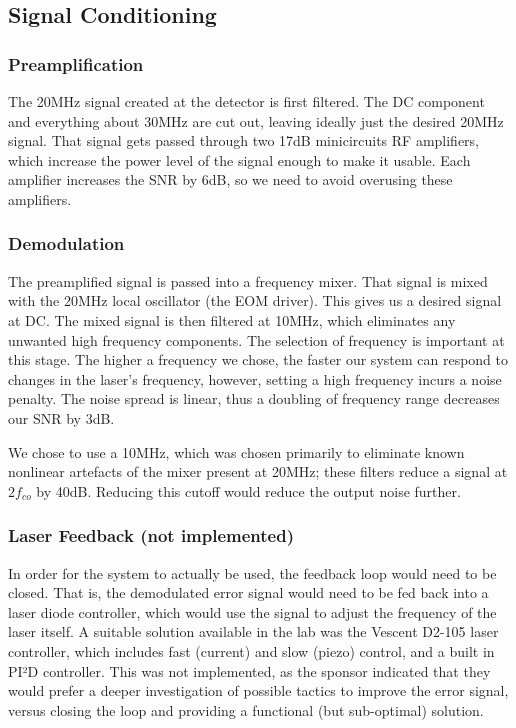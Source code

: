\subsection{Signal Conditioning}
    \subsubsection{Preamplification}

The 20MHz signal created at the detector is first filtered.  The DC component and everything about 30MHz are cut out, leaving ideally just the desired 20MHz signal.  That signal gets passed through two 17dB minicircuits RF amplifiers, which increase the power level of the signal enough to make it usable.  Each amplifier increases the SNR by 6dB, so we need to avoid overusing these amplifiers.

    \subsubsection{Demodulation}

The preamplified signal is passed into a frequency mixer.  That signal is mixed with the 20MHz local oscillator (the EOM driver).  This gives us a desired signal at DC.  The mixed signal is then filtered at 10MHz, which eliminates any unwanted high frequency components.  The selection of frequency is important at this stage.  The higher a frequency we chose, the faster our system can respond to changes in the laser's frequency, however, setting a high frequency incurs a noise penalty.  The noise spread is linear, thus a doubling of frequency range decreases our SNR by 3dB.

We chose to use a 10MHz, which was chosen primarily to eliminate known nonlinear artefacts of the mixer present at 20MHz; these filters reduce a signal at $2f_{co}$ by 40dB\cite{zfl_1000}.  Reducing this cutoff would reduce the output noise further.
    
    \subsubsection{Laser Feedback (not implemented)}

In order for the system to actually be used, the feedback loop would need to be closed.  That is, the demodulated error signal would need to be fed back into a laser diode controller, which would use the signal to adjust the frequency of the laser itself.  A suitable solution available in the lab was the Vescent D2-105 laser controller, which includes fast (current) and slow (piezo) control, and a built in PI²D controller.  This was not implemented, as the sponsor indicated that they would prefer a deeper investigation of possible tactics to improve the error signal, versus closing the loop and providing a functional (but sub-optimal) solution.

